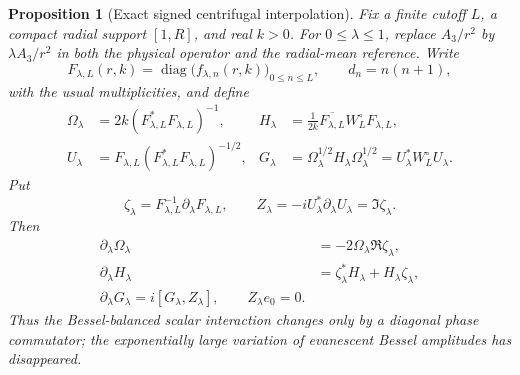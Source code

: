 \documentclass[11pt]{article}
\newtheorem{proposition}[theorem]{Proposition}
\theoremstyle{definition}
\theoremstyle{remark}
\begin{document}
\begin{proposition}[Exact signed centrifugal interpolation]
\label{prop:exact-centrifugal-interpolation}
Fix a finite cutoff $L$, a compact radial support $[1,R]$, and real $k>0$.
For $0\leq\lambda\leq1$, replace $A_3/r^2$ by
$\lambda A_3/r^2$ in both the physical operator and the radial-mean reference.
Write
\begin{equation}
 F_{\lambda,L}(r,k)
 =\operatorname{diag}\bigl(f_{\lambda,n}(r,k)\bigr)_{0\leq n\leq L},
 \qquad d_n=n(n+1),
 \label{eq:lambda-reference-jost}
\end{equation}
with the usual multiplicities, and define
\begin{align}
 \Omega_\lambda
 &=2k(F_{\lambda,L}^*F_{\lambda,L})^{-1},
 &
 H_\lambda
 &=\frac1{2k}\overline{F_{\lambda,L}}W_L^\circ F_{\lambda,L},
 \label{eq:lambda-balanced-coefficients}\\
 U_\lambda
 &=F_{\lambda,L}(F_{\lambda,L}^*F_{\lambda,L})^{-1/2},
 &
 G_\lambda
 &=\Omega_\lambda^{1/2}H_\lambda\Omega_\lambda^{1/2}
   =U_\lambda^*W_L^\circ U_\lambda.
 \label{eq:lambda-balanced-generator}
\end{align}
Put
\begin{equation}
 \zeta_\lambda=F_{\lambda,L}^{-1}\partial_\lambda F_{\lambda,L},
 \qquad
 Z_\lambda=-iU_\lambda^*\partial_\lambda U_\lambda
            =\Im\zeta_\lambda.
 \label{eq:centrifugal-phase-generator}
\end{equation}
Then
\begin{align}
 \partial_\lambda\Omega_\lambda
 &=-2\Omega_\lambda\Re\zeta_\lambda,
 \label{eq:centrifugal-omega-variation}\\
 \partial_\lambda H_\lambda
 &=\zeta_\lambda^*H_\lambda+H_\lambda\zeta_\lambda,
 \label{eq:centrifugal-H-variation}\\
 \boxed{\partial_\lambda G_\lambda
 =i[G_\lambda,Z_\lambda]},
 \qquad Z_\lambda e_0=0.
 \label{eq:centrifugal-balanced-commutator}
\end{align}
Thus the Bessel-balanced scalar interaction changes only by a diagonal phase
commutator; the exponentially large variation of evanescent Bessel amplitudes
has disappeared.


\end{proposition}
\end{document}
